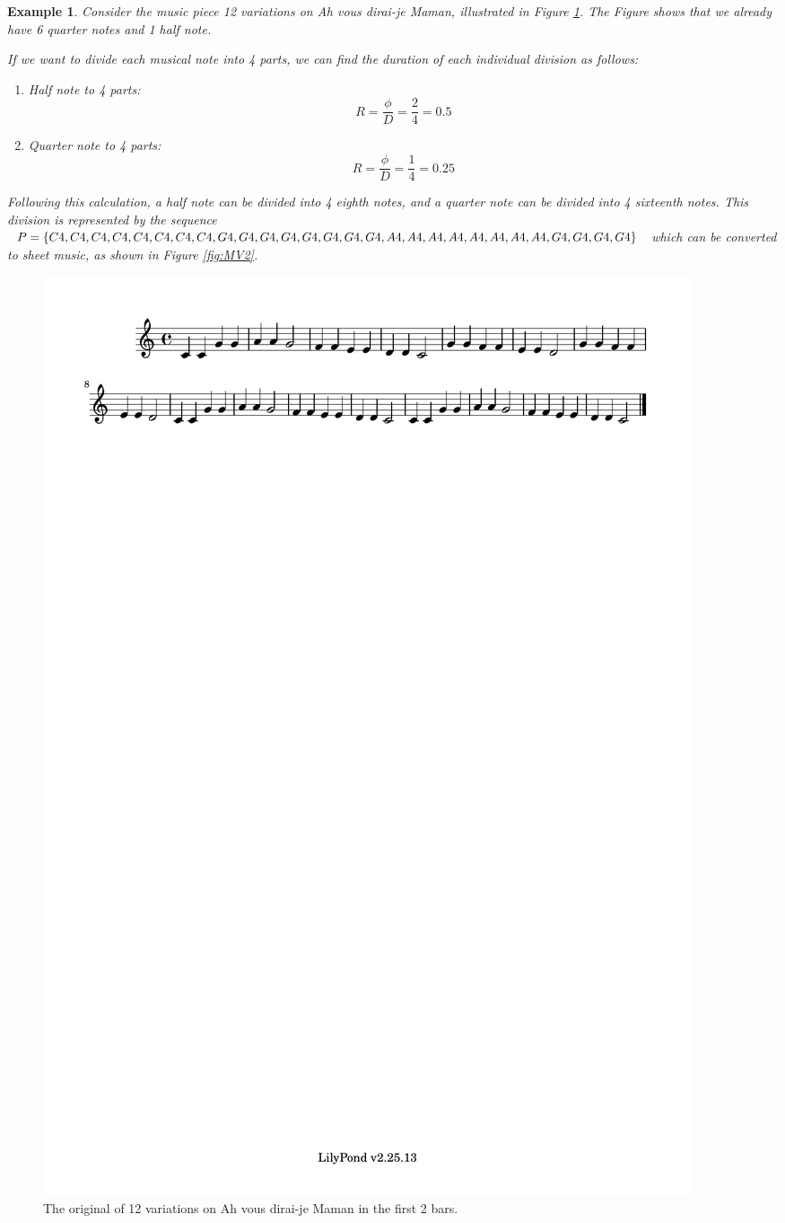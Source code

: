 \documentclass[11pt]{article}
\newtheorem{example}{Example}
\begin{document}
\begin{example}
Consider the music piece 12 variations on Ah vous dirai-je Maman, illustrated in Figure \ref{fig:MV1}. The Figure shows that we already have 6 quarter notes and 1 half note.

If we want to divide each musical note into 4 parts, we can find the duration of each individual division as follows:
\begin{enumerate}
  \item[$\bullet$] Half note to 4 parts: $$R = \frac{\phi}{D} = \frac{2}{4} = 0.5$$
  \item[$\bullet$] Quarter note to 4 parts: $$R = \frac{\phi}{D} = \frac{1}{4} = 0.25$$
\end{enumerate}

Following this calculation, a half note can be divided into 4 eighth notes, and a quarter note can be divided into 4 sixteenth notes. This division is represented by the sequence \\ $P = \{C4, C4, C4, C4, C4, C4, C4, C4, G4, G4, G4, G4, G4, G4, G4, G4, A4, A4, A4, A4, A4, A4, \\ A4, A4, G4, G4, G4, G4 \}$ which can be converted to sheet music, as shown in Figure \ref{fig:MV2}.
\end{example}

\begin{figure}
\centering
\includegraphics[trim=1cm 26.5cm 12.35cm 0.02cm, clip, scale=1]{dabby_1.pdf}
\caption{The original of 12 variations on Ah vous dirai-je Maman in the first 2 bars.}
\label{fig:MV1} 
\end{figure}
\end{document}
